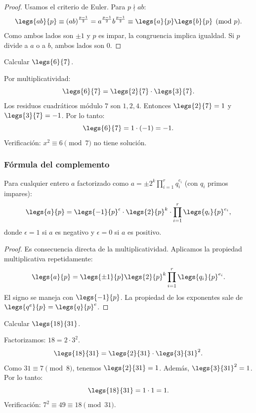 \begin{proof}
Usamos el criterio de Euler. Para $p \nmid ab$:
\[
\legs{ab}{p} \equiv (ab)^{\frac{p-1}{2}} = a^{\frac{p-1}{2}} b^{\frac{p-1}{2}} \equiv \legs{a}{p} \legs{b}{p} \pmod{p}.
\]
Como ambos lados son $\pm 1$ y $p$ es impar, la congruencia implica igualdad. Si $p$ divide a $a$ o a $b$, ambos lados son $0$.
\end{proof}

\begin{ejemplo}
Calcular $\legs{6}{7}$.
\end{ejemplo}
\begin{solucion}
Por multiplicatividad:
\[
\legs{6}{7} = \legs{2}{7} \cdot \legs{3}{7}.
\]
Los residuos cuadráticos módulo $7$ son $1, 2, 4$. Entonces $\legs{2}{7} = 1$ y $\legs{3}{7} = -1$. Por lo tanto:
\[
\legs{6}{7} = 1 \cdot (-1) = -1.
\]
Verificación: $x^2 \equiv 6 \pmod{7}$ no tiene solución.
\end{solucion}

\subsubsection{Fórmula del complemento}

\begin{teorema}
Para cualquier entero $a$ factorizado como $a = \pm 2^k \prod_{i=1}^r q_i^{e_i}$ (con $q_i$ primos impares):
\[
\legs{a}{p} =
\legs{-1}{p}^{\epsilon} \cdot
\legs{2}{p}^{k} \cdot
\prod_{i=1}^r \legs{q_i}{p}^{e_i},
\]
donde $\epsilon = 1$ si $a$ es negativo y $\epsilon = 0$ si $a$ es positivo.
\end{teorema}

\begin{proof}
Es consecuencia directa de la multiplicatividad. Aplicamos la propiedad multiplicativa repetidamente:
\[
\legs{a}{p} = \legs{\pm 1}{p} \legs{2}{p}^k \prod_{i=1}^r \legs{q_i}{p}^{e_i}.
\]
El signo se maneja con $\legs{-1}{p}$. La propiedad de los exponentes sale de $\legs{q^e}{p} = \legs{q}{p}^e$.
\end{proof}

\begin{ejemplo}
Calcular $\legs{18}{31}$.
\end{ejemplo}
\begin{solucion}
Factorizamos: $18 = 2 \cdot 3^2$.
\[
\legs{18}{31} = \legs{2}{31} \cdot \legs{3}{31}^2.
\]
Como $31 \equiv 7 \pmod{8}$, tenemos $\legs{2}{31} = 1$.
Además, $\legs{3}{31}^2 = 1$.
Por lo tanto:
\[
\legs{18}{31} = 1 \cdot 1 = 1.
\]
Verificación: $7^2 \equiv 49 \equiv 18 \pmod{31}$.
\end{solucion}

